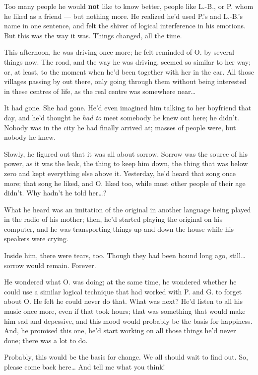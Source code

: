 Too many people he would \textbf{not} like to know better, people like L.-B., or P. whom he liked as a friend --- but nothing more. 
He realized he'd used P.'s and L.-B.'s name in one sentence, and felt the shiver of logical interference in his emotions. 
But this was the way it was. Things changed, all the time.

This afternoon, he was driving once more; he felt reminded of O. by several things now. The road, and the way he was driving, seemed so similar to her way; or, at least, to the moment when he'd been together with her in the car. All those villages passing by out there, only going through them without being interested in these centres of life, as the real centre was somewhere near\ldots

It had gone. She had gone. He'd even imagined him talking to her boyfriend that day, and he'd thought he \emph{had to} meet somebody he knew out here; he didn't. Nobody was in the city he had finally arrived at; masses of people were, but nobody he knew.

Slowly, he figured out that it was all about sorrow. Sorrow was the source of his power, as it was the leak, the thing to keep him down, the thing that was below zero and kept everything else above it. Yesterday, he'd heard that song once more; that song he liked, and O. liked too, while most other people of their age didn't. Why hadn't he told her\ldots?

What he heard was an imitation of the original in another language being played in the radio of his mother; then, he'd started playing the original on his computer, and he was transporting things up and down the house while his speakers were crying.

Inside him, there were tears, too. Though they had been bound long ago, still\ldots sorrow would remain. Forever.

He wondered what O. was doing; at the same time, he wondered whether he could use a similar logical technique that had worked with P. and G. to forget about O. He felt he could never do that. What was next? He'd listen to all his music once more, even if that took hours; that was something that would make him sad and depessive, and this mood would probably be the basis for happiness. And, he promised this one, he'd start working on all those things he'd never done; there was a lot to do.

Probably, this would be the basis for change. 
We all should wait to find out. 
So, please come back here\ldots
And tell me what you think!


